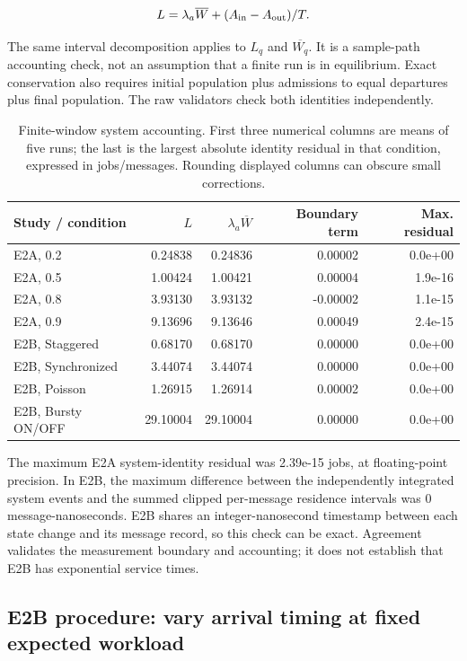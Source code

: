 \[ L=\lambda_a\overline{W}+(A_{\rm in}-A_{\rm out})/T. \]

The same interval decomposition applies to $L_q$ and $\overline{W_q}$. It is a sample-path accounting check, not an assumption that a finite run is in equilibrium. Exact conservation also requires initial population plus admissions to equal departures plus final population. The raw validators check both identities independently.

\begin{table}[H]\centering
\small
\setlength{\tabcolsep}{5pt}
\begin{tabular}{lrrrr}
\hline
Study / condition & $L$ & $\lambda_a\overline{W}$ & Boundary term & Max. residual \\
\hline
E2A, 0.2 & 0.24838 & 0.24836 & 0.00002 & 0.0e+00 \\
E2A, 0.5 & 1.00424 & 1.00421 & 0.00004 & 1.9e-16 \\
E2A, 0.8 & 3.93130 & 3.93132 & -0.00002 & 1.1e-15 \\
E2A, 0.9 & 9.13696 & 9.13646 & 0.00049 & 2.4e-15 \\
E2B, Staggered & 0.68170 & 0.68170 & 0.00000 & 0.0e+00 \\
E2B, Synchronized & 3.44074 & 3.44074 & 0.00000 & 0.0e+00 \\
E2B, Poisson & 1.26915 & 1.26914 & 0.00002 & 0.0e+00 \\
E2B, Bursty ON/OFF & 29.10004 & 29.10004 & 0.00000 & 0.0e+00 \\
\hline
\end{tabular}
\caption{Finite-window system accounting. First three numerical columns are means of five runs; the last is the largest absolute identity residual in that condition, expressed in jobs/messages. Rounding displayed columns can obscure small corrections.}
\label{tab:little}
\end{table}

The maximum E2A system-identity residual was 2.39e-15 jobs, at floating-point precision. In E2B, the maximum difference between the independently integrated system events and the summed clipped per-message residence intervals was 0 message-nanoseconds. E2B shares an integer-nanosecond timestamp between each state change and its message record, so this check can be exact. Agreement validates the measurement boundary and accounting; it does not establish that E2B has exponential service times.

\subsection{E2B procedure: vary arrival timing at fixed expected workload}

